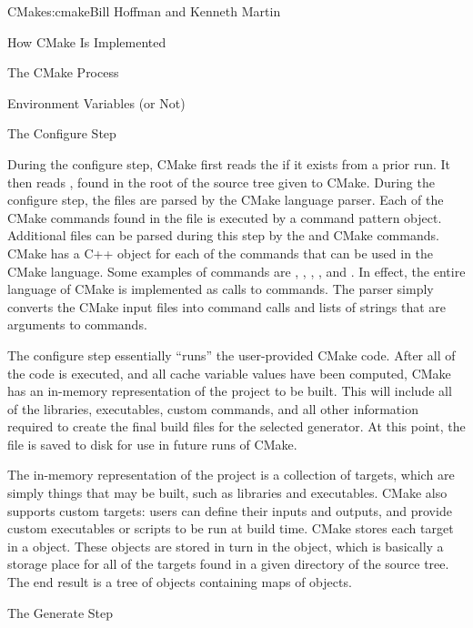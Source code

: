 \begin{aosachapter}{CMake}{s:cmake}{Bill Hoffman and Kenneth Martin}
\begin{aosasect1}{How CMake Is Implemented}
\begin{aosasect2}{The CMake Process}
\begin{aosasect3}{Environment Variables (or Not)}
\end{aosasect3}

\begin{aosasect3}{The Configure Step}

During the configure step, CMake first reads the 
if it exists from a prior run.  It then reads ,
found in the root of the source tree given to CMake. During the
configure step, the  files are parsed by the
CMake language parser. Each of the CMake commands found in the file is
executed by a command pattern object. Additional 
files can be parsed
during this step by the  and 
CMake commands.
CMake has a C++ object for each of the commands that can be used in
the CMake language. Some examples of commands are ,
, , , and
. In effect, the entire language of CMake is implemented
as calls to commands. The parser simply converts the CMake input files
into command calls and lists of strings that are arguments to
commands.

The configure step essentially ``runs'' the user-provided CMake
code. After all of the code is executed, and all cache variable values
have been computed, CMake has an in-memory representation of the
project to be built. This will include all of the libraries,
executables, custom commands, and all other information required to
create the final build files for the selected generator. At this
point, the  file is saved to disk for use in
future runs of CMake.

The in-memory representation of the project is a collection of
targets, which are simply things that may be built, such as
libraries and executables. CMake also supports custom
targets: users can define their inputs and outputs, and provide
custom executables or scripts to be run at build time. CMake
stores each target in a  object. These objects are
stored in turn in the  object, which is basically a
storage place for all of the targets found in a given directory of the
source tree. The end result is a tree of  objects
containing maps of  objects.

\end{aosasect3}

\begin{aosasect3}{The Generate Step}


\end{aosasect3}
\end{aosasect2}
\end{aosasect1}
\end{aosachapter}
